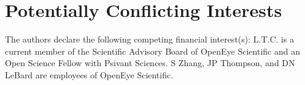 \section{Potentially Conflicting Interests}

The authors declare the following competing financial interest(s): L.T.C. is a current member of the Scientific Advisory Board of OpenEye Scientific and an Open Science Fellow with Psivant Sciences. S Zhang, JP Thompson, and DN LeBard are employees of OpenEye Scientific.